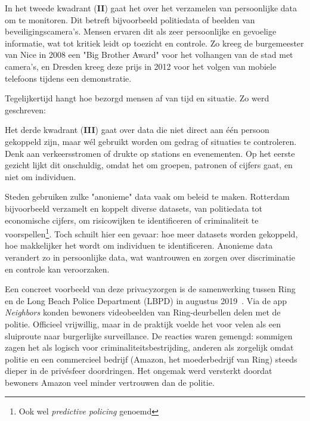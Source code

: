 \documentclass[nonacm, sigconf]{acmart}
\begin{document}
    In het tweede kwadrant (\textbf{II}) gaat het over het verzamelen van persoonlijke data om te monitoren.
    Dit betreft bijvoorbeeld politiedata of beelden van beveiligingscamera's.
    Mensen ervaren dit als zeer persoonlijke en gevoelige informatie, wat tot kritiek leidt op toezicht en controle.
    Zo kreeg de burgemeester van Nice in 2008 een "Big Brother Award" voor het volhangen van de stad met camera's, en Dresden kreeg deze prijs in 2012 voor het volgen van mobiele telefoons tijdens een demonstratie.

    Tegelijkertijd hangt hoe bezorgd mensen af van tijd en situatie.
    Zo werd geschreven:

    Het derde kwadrant (\textbf{III}) gaat over data die niet direct aan één persoon gekoppeld zijn, maar wél gebruikt worden om gedrag of situaties te controleren.
    Denk aan verkeersstromen of drukte op stations en evenementen.
    Op het eerste gezicht lijkt dit onschuldig, omdat het om groepen, patronen of cijfers gaat, en niet om individuen.

    Steden gebruiken zulke "anonieme" data vaak om beleid te maken.
    Rotterdam bijvoorbeeld verzamelt en koppelt diverse datasets, van politiedata tot economische cijfers, om risicowijken te identificeren of criminaliteit te voorspellen\footnote{Ook wel \textit{predictive policing} genoemd}.
    Toch schuilt hier een gevaar: hoe meer datasets worden gekoppeld, hoe makkelijker het wordt om individuen te identificeren.
    Anonieme data verandert zo in persoonlijke data, wat wantrouwen en zorgen over discriminatie en controle kan veroorzaken.

    Een concreet voorbeeld van deze privacyzorgen is de samenwerking tussen Ring en de Long Beach Police Department (LBPD) in augustus 2019~\parencite{shaffer2021applying}.
    Via de app \textit{Neighbors} konden bewoners videobeelden van Ring-deurbellen delen met de politie.
    Officieel vrijwillig, maar in de praktijk voelde het voor velen als een sluiproute naar burgerlijke surveillance.
    De reacties waren gemengd: sommigen zagen het als logisch voor criminaliteitsbestrijding, anderen als zorgelijk omdat politie en een commercieel bedrijf (Amazon, het moederbedrijf van Ring) steeds dieper in de privésfeer doordringen.
    Het ongemak werd versterkt doordat bewoners Amazon veel minder vertrouwen dan de politie.
\end{document}
